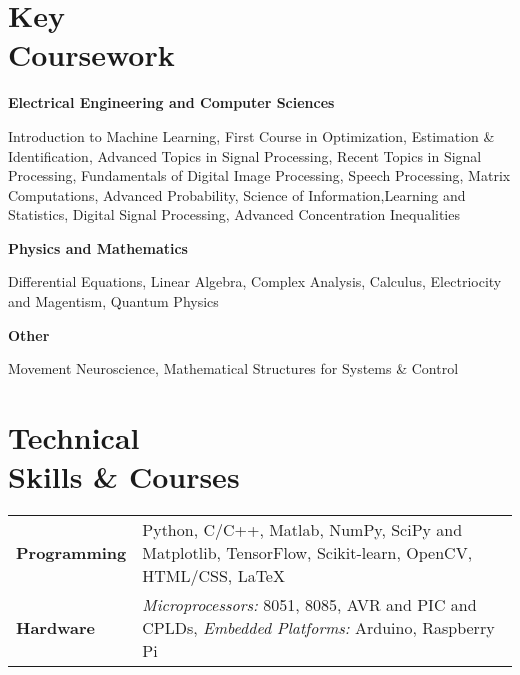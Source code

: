\documentclass[margin,line, 9pt]{res}
\newenvironment{list1}{
  \begin{list}{\ding{113}}{%
      \setlength{\itemsep}{0in}
      \setlength{\parsep}{0in} \setlength{\parskip}{0in}
      \setlength{\topsep}{0in} \setlength{\partopsep}{0in} 
      \setlength{\leftmargin}{0.17in}}}{\end{list}}
\begin{document}
\begin{resume}


\section{\sc Key \\Coursework} 
\begin{list1}

\item[\strut\hspace{0.5cm}\hypertarget{crselst}{\textbf{Electrical Engineering and Computer Sciences}}]
\item[] Introduction to Machine Learning, First Course in Optimization, Estimation \& Identification, Advanced Topics in Signal Processing, Recent Topics in Signal Processing, Fundamentals of Digital Image Processing, Speech Processing, Matrix Computations, Advanced Probability, Science of Information,Learning and Statistics, Digital Signal Processing, Advanced Concentration Inequalities
\item[\strut\hspace{0.5cm}\textbf{Physics and Mathematics}]
\vspace{0.05in}
\item[]Differential Equations, Linear Algebra, Complex Analysis, Calculus, Electriocity and Magentism, Quantum Physics
\item[\strut\hspace{0.5cm}\textbf{Other}]
\vspace{0.05in}
\item[]Movement Neuroscience, Mathematical Structures for Systems \& Control
\end{list1}


\section{\sc Technical \\Skills \& Courses}
\begin{tabular}{@{}p{1.3in}p{4.3in}}
\textbf{Programming} & Python, C/C++, Matlab, NumPy, SciPy and Matplotlib, TensorFlow, Scikit-learn, OpenCV,  HTML/CSS, \LaTeX \\  
\vspace*{-0.06in}
\textbf{Hardware} &
\vspace*{-0.06in}
\textit{Microprocessors:} 8051, 8085, AVR and PIC and CPLDs, \textit{Embedded Platforms:} Arduino, Raspberry Pi \\


\end{tabular}
\end{resume}
\end{document}
